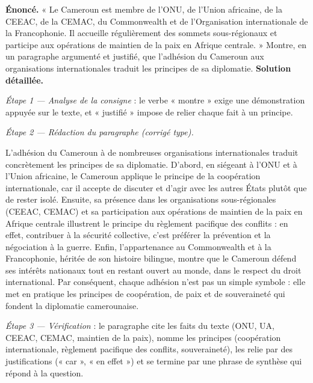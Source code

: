 \documentclass[11pt]{article}
\begin{document}
\begin{exoresolu}
\textbf{Énoncé.} « Le Cameroun est membre de l'ONU, de l'Union africaine, de la CEEAC, de la CEMAC, du Commonwealth et de l'Organisation internationale de la Francophonie. Il accueille régulièrement des sommets sous-régionaux et participe aux opérations de maintien de la paix en Afrique centrale. » Montre, en un paragraphe argumenté et justifié, que l'adhésion du Cameroun aux organisations internationales traduit les principes de sa diplomatie.
\tcblower
\textbf{Solution détaillée.}

\emph{Étape 1 — Analyse de la consigne} : le verbe « montre » exige une démonstration appuyée sur le texte, et « justifié » impose de relier chaque fait à un principe.

\emph{Étape 2 — Rédaction du paragraphe (corrigé type).}

L'adhésion du Cameroun à de nombreuses organisations internationales traduit concrètement les principes de sa diplomatie. D'abord, en siégeant à l'ONU et à l'Union africaine, le Cameroun applique le principe de la coopération internationale, car il accepte de discuter et d'agir avec les autres États plutôt que de rester isolé. Ensuite, sa présence dans les organisations sous-régionales (CEEAC, CEMAC) et sa participation aux opérations de maintien de la paix en Afrique centrale illustrent le principe du règlement pacifique des conflits : en effet, contribuer à la sécurité collective, c'est préférer la prévention et la négociation à la guerre. Enfin, l'appartenance au Commonwealth et à la Francophonie, héritée de son histoire bilingue, montre que le Cameroun défend ses intérêts nationaux tout en restant ouvert au monde, dans le respect du droit international. Par conséquent, chaque adhésion n'est pas un simple symbole : elle met en pratique les principes de coopération, de paix et de souveraineté qui fondent la diplomatie camerounaise.

\emph{Étape 3 — Vérification} : le paragraphe cite les faits du texte (ONU, UA, CEEAC, CEMAC, maintien de la paix), nomme les principes (coopération internationale, règlement pacifique des conflits, souveraineté), les relie par des justifications (« car », « en effet ») et se termine par une phrase de synthèse qui répond à la question.
\end{exoresolu}
\end{document}
